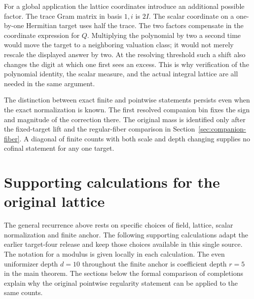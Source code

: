 \documentclass[12pt,letterpaper]{article}
\begin{document}
For a global application the lattice coordinates introduce an additional possible factor. The trace Gram matrix in basis $1,i$ is $2I$. The scalar coordinate on a one-by-one Hermitian target uses half the trace. The two factors compensate in the coordinate expression for $Q$. Multiplying the polynomial by two a second time would move the target to a neighboring valuation class; it would not merely rescale the displayed answer by two. At the resolving threshold such a shift also changes the digit at which one first sees an excess. This is why verification of the polynomial identity, the scalar measure, and the actual integral lattice are all needed in the same argument.

The distinction between exact finite and pointwise statements persists even when the exact normalization is known. The first resolved companion bin fixes the sign and magnitude of the correction there. The original mass is identified only after the fixed-target lift and the regular-fiber comparison in Section~\ref{sec:companion-fiber}. A diagonal of finite counts with both scale and depth changing supplies no cofinal statement for any one target.

\section{Supporting calculations for the original lattice}
The general recurrence above rests on specific choices of field, lattice, scalar normalization and finite anchor. The following supporting calculations adapt the earlier target-four release and keep those choices available in this single source. The notation for a modulus is given locally in each calculation. The even uniformizer depth $d=10$ throughout the finite anchor is coefficient depth $r=5$ in the main theorem. The sections below the formal comparison of completions explain why the original pointwise regularity statement can be applied to the same counts.
\end{document}
